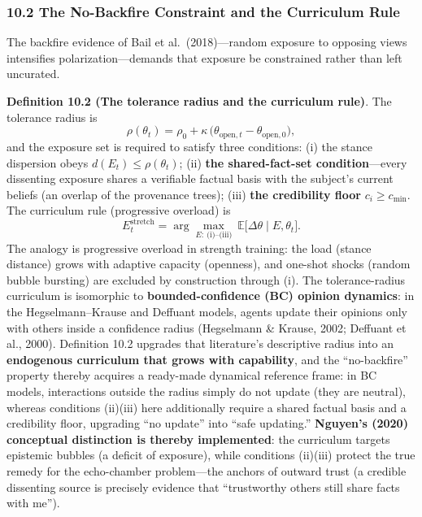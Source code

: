 \documentclass[
  11pt]{article}
\begin{document}
\subsubsection{10.2 The No-Backfire Constraint and the Curriculum
Rule}\label{the-no-backfire-constraint-and-the-curriculum-rule}

The backfire evidence of Bail et al.~(2018)---random exposure to
opposing views intensifies polarization---demands that exposure be
constrained rather than left uncurated.

\textbf{Definition 10.2 (The tolerance radius and the curriculum rule)}.
The tolerance radius is
\[\rho(\theta_t) = \rho_0 + \kappa\,\big(\theta_{\mathrm{open},t} - \theta_{\mathrm{open},0}\big),\]
and the exposure set is required to satisfy three conditions: (i) the
stance dispersion obeys \(d(E_t) \le \rho(\theta_t)\); (ii) \textbf{the
shared-fact-set condition}---every dissenting exposure shares a
verifiable factual basis with the subject's current beliefs (an overlap
of the provenance trees); (iii) \textbf{the credibility floor}
\(c_i \ge c_{\min}\). The curriculum rule (progressive overload) is
\[E_t^{\mathrm{stretch}} = \arg\max_{E:\ \text{(i)–(iii)}}\ \mathbb{E}\big[\Delta\theta \mid E, \theta_t\big].\]
The analogy is progressive overload in strength training: the load
(stance distance) grows with adaptive capacity (openness), and one-shot
shocks (random bubble bursting) are excluded by construction through
(i). The tolerance-radius curriculum is isomorphic to
\textbf{bounded-confidence (BC) opinion dynamics}: in the
Hegselmann--Krause and Deffuant models, agents update their opinions
only with others inside a confidence radius (Hegselmann \& Krause, 2002;
Deffuant et al., 2000). Definition 10.2 upgrades that literature's
descriptive radius into an \textbf{endogenous curriculum that grows with
capability}, and the ``no-backfire'' property thereby acquires a
ready-made dynamical reference frame: in BC models, interactions outside
the radius simply do not update (they are neutral), whereas conditions
(ii)(iii) here additionally require a shared factual basis and a
credibility floor, upgrading ``no update'' into ``safe updating.''
\textbf{Nguyen's (2020) conceptual distinction is thereby implemented}:
the curriculum targets epistemic bubbles (a deficit of exposure), while
conditions (ii)(iii) protect the true remedy for the echo-chamber
problem---the anchors of outward trust (a credible dissenting source is
precisely evidence that ``trustworthy others still share facts with
me'').
\end{document}
